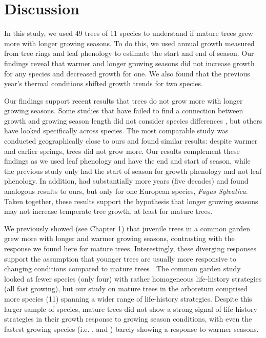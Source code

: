 \clearpage
\section{Discussion}
In this study, we used 49 trees of 11 species to understand if mature trees grew more with longer growing seasons. To do this, we used annual growth measured from tree rings and leaf phenology to estimate the start and end of season. Our findings reveal that warmer and longer growing seasons did not increase growth for any species and decreased growth for one. We also found that the previous year's thermal conditions shifted growth trends for two species. 

Our findings support recent results that trees do not grow more with longer growing seasons. Some studies that have failed to find a connection between growth and growing season length did not consider species differences \citep[e.g.,][]{cabon_water_2020}, but others have looked specifically across species. The most comparable study \citep[with eight species in common with our dataset;][]{dow_warm_2022} was conducted geographically close to ours and found similar results: despite warmer and earlier springs, trees did not grow more. Our results complement these findings as we used leaf phenology and have the end and start of season, while the previous study only had the start of season for growth phenology and not leaf phenology. In addition, \cite{cufar_variations_2015} had substantially more years (five decades) and found analogous results to ours, but only for one European species, \textit{Fagus Sylvatica}. Taken together, these results support the hypothesis that longer growing seasons may not increase temperate tree growth, at least for mature trees. 

We previously showed (see Chapter 1) that juvenile trees in a common garden grew more with longer and warmer growing seasons, contrasting with the response we found here for mature trees. Interestingly, these diverging responses support the assumption that younger trees are usually more responsive to changing conditions compared to mature trees \citep{wolkovich_why_2025}. The common garden study looked at fewer species (only four) with rather homogeneous life-history strategies (all fast growing), but our study on mature trees in the arboretum comprised more species (11) spanning a wider range of life-history strategies. Despite this larger sample of species, mature trees did not show a strong signal of life-history strategies in their growth response to growing season conditions, with even the fastest growing species (i.e. {\Bnig}, {\Pdel} and {\Tame}) barely showing a response to warmer seasons.

